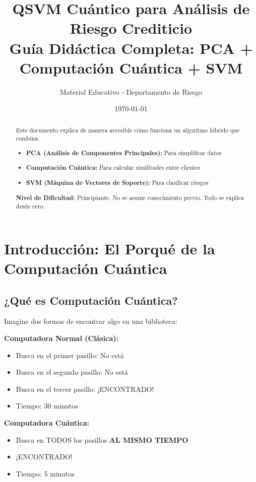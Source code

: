 \documentclass[11pt,a4paper,spanish]{article}
\title{\textbf{QSVM Cuántico para Análisis de Riesgo Crediticio} \\ {\large Guía Didáctica Completa: PCA + Computación Cuántica + SVM}}
\author{Material Educativo - Departamento de Riesgo}
\date{\today}
\begin{document}
\maketitle

\begin{abstract}
Este documento explica de manera accesible cómo funciona un algoritmo híbrido que combina:
\begin{itemize}
    \item \textbf{PCA (Análisis de Componentes Principales):} Para simplificar datos
    \item \textbf{Computación Cuántica:} Para calcular similitudes entre clientes
    \item \textbf{SVM (Máquina de Vectores de Soporte):} Para clasificar riesgos
\end{itemize}

\textbf{Nivel de Dificultad:} Principiante. No se asume conocimiento previo. Todo se explica desde cero.
\end{abstract}

\tableofcontents
\newpage

\section{Introducción: El Porqué de la Computación Cuántica}

\subsection{¿Qué es Computación Cuántica?}

Imagine dos formas de encontrar algo en una biblioteca:

\textbf{Computadora Normal (Clásica):}
\begin{itemize}
    \item Busca en el primer pasillo: No está
    \item Busca en el segundo pasillo: No está
    \item Busca en el tercer pasillo: ¡ENCONTRADO!
    \item Tiempo: 30 minutos
\end{itemize}

\textbf{Computadora Cuántica:}
\begin{itemize}
    \item Busca en TODOS los pasillos \textbf{AL MISMO TIEMPO}
    \item ¡ENCONTRADO!
    \item Tiempo: 5 minutos
\end{itemize}
\end{document}
